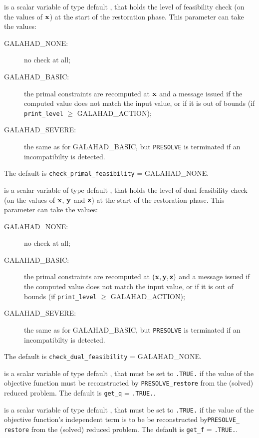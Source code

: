 \documentclass{galahad}
\newcommand{\packagename}{PRESOLVE}
\newcommand{\sym}{\sf\small}
\begin{document}
\begin{description}
 is a scalar variable of type default
\integer, that holds the level of feasibility check (on the values of ${\mathbf{x}}$)
at the start of the restoration phase.  This parameter can
take the values:
\begin{description}
\item[\sym GALAHAD\_NONE:] no check at all;
\item[\sym GALAHAD\_BASIC:] the primal constraints are recomputed at ${\mathbf{x}}$
             and a message issued if the computed value
             does not match the input value, or if it is
             out of bounds (if {\tt print\_level} $\geq$ {\sym GALAHAD\_ACTION});
\item[\sym GALAHAD\_SEVERE:] the same as for {\sym GALAHAD\_BASIC}, but {\tt \packagename} is
              terminated if an incompatibilty is detected.
\end{description}
The default is {\tt check\_primal\_feasibility} = {\sym GALAHAD\_NONE}.

 is a scalar variable of type default
\integer, that holds the level of dual feasibility check (on the values of
${\mathbf{x}}$, ${\mathbf{y}}$ and ${\mathbf{z}}$) at the start of the restoration phase.  This
parameter can take the values:
\begin{description}
\item[\sym GALAHAD\_NONE:] no check at all;
\item[\sym GALAHAD\_BASIC:] the primal constraints are recomputed at $({\mathbf{x}},{\mathbf{y}},{\mathbf{z}})$
             and a message issued if the computed value
             does not match the input value, or if it is
             out of bounds (if {\tt print\_level} $\geq$ {\sym GALAHAD\_ACTION});
\item[\sym GALAHAD\_SEVERE:] the same as for {\sym GALAHAD\_BASIC}, but {\tt \packagename} is
              terminated if an incompatibilty is detected.
\end{description}
The default is {\tt check\_dual\_feasibility} = {\sym GALAHAD\_NONE}.

 is a scalar variable of type default \logical, that
must be set to {\tt .TRUE.} if the value of the objective
function must be reconstructed by {\tt \packagename\_restore} from the
(solved) reduced problem. 
The default is {\tt get\_q} = {\tt .TRUE.}.

 is a scalar variable of type default \logical, that
must be set to {\tt .TRUE.} if the value of the objective
function's independent term is to be be reconstructed
by{\tt \packagename\_ restore} from the (solved) reduced problem.
The default is {\tt get\_f} = {\tt .TRUE.}.


\end{description}
\end{document}
